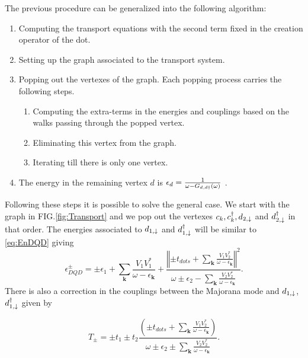 \documentclass[showpacs,aps,prb,reprint,superscriptaddress]{revtex4-1}
\begin{document}
The previous procedure can be generalized into the following algorithm:

\begin{enumerate}
    \item Computing the transport equations with the second term fixed in the creation operator of the dot.
     \item  Setting up the  graph associated to the transport system.
    \item Popping out the vertexes of the graph. Each popping process carries the following steps.
    \begin{enumerate}
        \item Computing the extra-terms in the energies and couplings based on the walks passing through the popped vertex.
        \item Eliminating this vertex from the graph. 
        \item Iterating till there is only one  vertex.
        \end{enumerate}
    \item The energy in the remaining vertex $d$ is $\epsilon_d = \frac{1}{\omega -G_{d,d\dagger}(\omega)}$ .
\end{enumerate}
  


Following these steps it is possible to solve the general case.  We start with the graph in FIG.\ref{fig:Transport} and we pop out the vertexes $c_k,c^\dagger_k, d_{2,\downarrow}$ and $ d^\dagger_{2,\downarrow}$ in that order. The energies associated to $d_{1,\downarrow}$ and $d^\dagger_{1,\downarrow}$ will be similar to \eqref{eq:EnDQD} giving 
\begin{equation}
    \epsilon_{DQD}^{\pm}=\pm\epsilon_{1}+\sum_{\mathbf{k}}\frac{V_{1}V_{1}^{*}}{\omega-\epsilon_{\mathbf{k}}}+\frac{\left\Vert \pm t_{dots}+\sum_{\mathbf{k}}\frac{V_{1}V_{2}^{*}}{\omega-\epsilon_{\mathbf{k}}}\right\Vert ^{2}}{\omega\pm\epsilon_{2}-\sum_{\mathbf{k}}\frac{V_{2}V_{2}^{*}}{\omega-\epsilon_{\mathbf{k}}}}. \label{eq:epDQD}
\end{equation}
\noindent There is also a correction in the couplings between the Majorana mode and $d_{1,\downarrow}$, $d^\dagger_{1,\downarrow}$ given by 

\begin{equation}
    T_{\pm}=\pm t_{1}\pm t_{2}\frac{\left(\pm t_{dots}+\sum_{\mathbf{k}}\frac{V_{1}V_{2}^{*}}{\omega-\epsilon_{\mathbf{k}}}\right)}{\omega\pm\epsilon_{2}\pm\sum_{\mathbf{k}}\frac{V_{2}V_{2}^{*}}{\omega-\epsilon_{\mathbf{k}}}}. \label{eq:T+-}
\end{equation}
\end{document}
